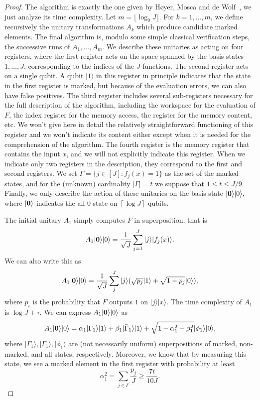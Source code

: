 \documentclass[12pt]{article}
\newcommand{\floor}[1]{\lfloor #1 \rfloor}
\newcommand{\ceil}[1]{\left\lceil #1 \right\rceil}
\newcommand{\ket}[1]{|#1\rangle}
\theoremstyle{definition}
\begin{document}
\begin{proof}
The algorithm is exactly the one given by H{\o}yer, Mosca and de Wolf~\cite{hoyer2003quantum}, we just analyze its time complexity. 
Let $m=\floor{\log_9 J}$. For $k = 1, \ldots, m$, we define recursively the unitary transformations $A_k$ which produce candidate marked elements. 
The final algorithm is, modulo some simple classical verification steps, the successive runs of $A_1, \ldots, A_m$. 
We describe these unitaries as acting on four registers, where the first register acts on the space spanned by the basis states $1, \ldots, J$, corresponding to the indices of the $J$ functions.
The second register acts on a single qubit. A qubit $\ket{1}$ in this register in principle indicates that the state in the first register is marked, but because of the evaluation errors, we can also have false positives.
The third register includes several sub-registers necessary for the full description of the algorithm, including the workspace for the evaluation of $F$, the index register for the memory access, the register for the memory content, etc.
We won't give here in detail the relatively straightforward functioning of this register and we won't indicate its content either except when it is needed
for the comprehension of the algorithm. The fourth register is the memory register that contains the input $x$, and we will not explicitly indicate
this register.
When we indicate only two registers in the description, they correspond to the first and second registers.
We set $\Gamma = \{ j \in [J] : f_j(x) = 1\}$ as the set of the marked states, and for the (unknown) cardinality $|\Gamma | =t$ we suppose that $1 \leq t \leq J/9$. Finally, we only describe the action of these unitaries on the basis state $\ket{{\bf 0}} \ket{0},$ where $\ket{{\bf 0}}$ indicates
the all $0$ state on $\ceil{\log J}$ qubits.

The initial unitary $A_1$ simply computes $F$ in superposition, that is
\[
A_1 \ket{{\bf 0}} \ket{0} = \frac{1}{\sqrt{J}} \sum_{j=1}^{J} \ket{j} \ket{f_j(x)}.
\]
We can also write this as 
\[
A_1 \ket{{\bf 0}} \ket{0} = \frac{1}{\sqrt{J}} \sum_{j}^{J} \ket{j}(\sqrt{p_j} \ket{1} + \sqrt{1 - p_j}  \ket{0}),
\]
where $p_i$ is the probability that $F$ outputs $1$ on $\ket{j} \ket{x} $.
The time complexity of $A_1$ is $\log J + \tau.$
We can express $A_1 \ket{{\bf 0}} \ket{0}$ as
$$
A_1 \ket{{\bf 0}} \ket{0} = \alpha_1 \ket{\Gamma_1}\ket{1} + \beta_1 \ket{\bar{\Gamma}_1}\ket{1} + 
\sqrt{ 1 - \alpha_1^2 - \beta_1^2 }  \ket{\phi_1}   \ket{0},
$$
where $\ket{\Gamma_1}, \ket{\bar{\Gamma}_1},  \ket{\phi_1} $ are (not necessarily uniform) superpositions of marked, non-marked, and all states, respectively. Moreover, we know that by measuring this state, we see a marked element in the first register with probability at least
$$
\alpha_1^2 = \sum_{j \in \Gamma} \frac{p_j}{J } \geq \frac{7t}{10J}.
$$


\end{proof}
\end{document}
